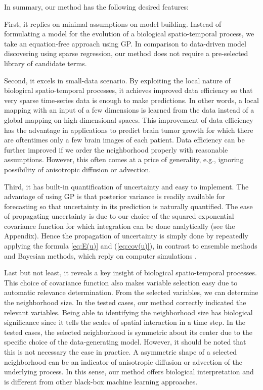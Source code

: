 \documentclass[smallextended,natbib]{svjour3}       %
\begin{document}
In summary, our method has the following desired features:

First, it replies on minimal assumptions on model building. Instead of formulating a model for the evolution of a biological spatio-temporal process, we take an equation-free approach using GP. In comparison to data-driven model discovering using sparse regression, our method does not require a pre-selected library of candidate terms.

Second, it excels in small-data scenario. By exploiting the local nature of biological spatio-temporal processes, it achieves improved data efficiency so that very sparse time-series data is enough to make predictions. In other words, a local mapping with an input of a few dimensions is learned from the data instead of a global mapping on high dimensional spaces. This improvement of data efficiency has the advantage in applications to predict brain tumor growth for which there are oftentimes only a few brain images of each patient. Data efficiency can be further improved if we order the neighborhood properly with reasonable assumptions. However, this often comes at a price of generality, e.g., ignoring possibility of anisotropic diffusion or advection.   

Third, it has built-in quantification of uncertainty and easy to implement. The advantage of using GP is that posterior variance is readily available for forecasting so that uncertainty in its prediction is naturally quantified. The ease of propagating uncertainty is due to our choice of the squared exponential covariance function for which integration can be done analytically (see the Appendix). Hence the propagation of uncertainty is simply done by repeatedly applying the formula \ref{eq:E(u)} and (\ref{eq:cov(u)}), in contrast to ensemble methods and Bayesian methods, which reply on computer simulations \citep{lipkova2019personalized,Kostelich2011a}.   

Last but not least, it reveals a key insight of biological spatio-temporal processes.  This choice of covariance function also makes variable selection easy due to automatic relevance determination. From the selected variables, we can determine the neighborhood size. In the tested cases, our method correctly indicated the relevant variables. Being able to identifying the neighborhood size has biological significance since it tells the scales of spatial interaction in a time step. In the tested cases, the selected neighborhood is symmetric about its center due to the specific choice of the data-generating model. However, it should be noted that this is not necessary the case in practice. A asymmetric shape of a selected neighborhood can be an indicator of anisotropic diffusion or advection of the underlying process. In this sense, our method offers biological interpretation and is different from other black-box machine learning approaches. 
\end{document}
